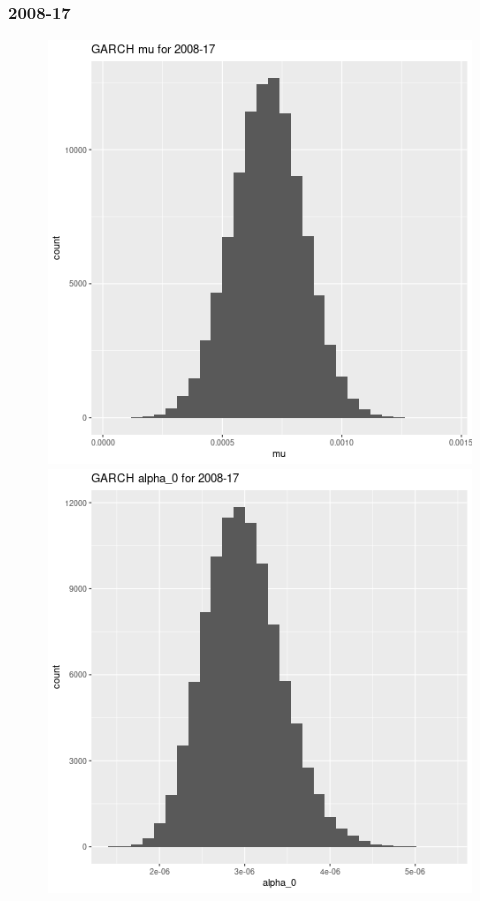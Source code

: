 \documentclass[12pt,letterpaper,reqno,fleqn]{article}
\begin{document}
\subsubsection{2008-17}
\begin{figure}
\includegraphics[scale = .4]{gmu0817}
\includegraphics[scale = .4]{ga00817}

\end{figure}
\end{document}
